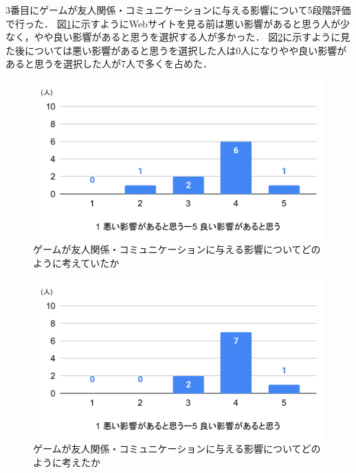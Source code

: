 \documentclass[12pt,a4j,titlepage]{ltjsarticle}
\begin{document}
3番目にゲームが友人関係・コミュニケーションに与える影響について5段階評価で行った．
図\ref{fig:コミュ前}に示すようにWebサイトを見る前は悪い影響があると思う人が少なく，やや良い影響があると思うを選択する人が多かった．
図\ref{fig:コミュ後}に示すように見た後については悪い影響があると思うを選択した人は0人になりやや良い影響があると思うを選択した人が7人で多くを占めた．

\begin{figure}[H]
 \begin{center}
  \includegraphics[keepaspectratio, scale=0.6]{PDF/コミュ前.pdf}
 \end{center}
 \caption{ゲームが友人関係・コミュニケーションに与える影響についてどのように考えていたか}
 \label{fig:コミュ前}
\end{figure}

\begin{figure}[H]
 \begin{center}
  \includegraphics[keepaspectratio, scale=0.6]{PDF/コミュ後.pdf}
 \end{center}
 \caption{ゲームが友人関係・コミュニケーションに与える影響についてどのように考えたか}
 \label{fig:コミュ後}
\end{figure}
\end{document}
